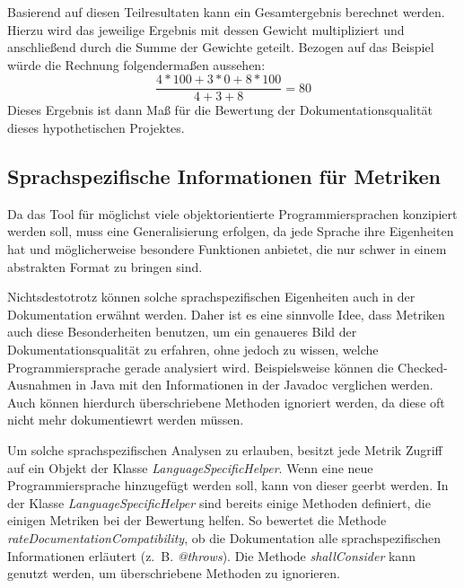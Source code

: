 Basierend auf diesen Teilresultaten kann ein Gesamtergebnis berechnet werden. Hierzu wird das jeweilige Ergebnis mit dessen Gewicht multipliziert und anschließend durch die Summe der Gewichte geteilt. Bezogen auf das Beispiel würde die Rechnung folgendermaßen aussehen:
\begin{equation}
    \frac{4*100 + 3*0 + 8*100}{4+3+8}=80
\end{equation}
Dieses Ergebnis ist dann Maß für die Bewertung der Dokumentationsqualität dieses hypothetischen Projektes. 


\subsection{Sprachspezifische Informationen für Metriken}\label{chapter:langSpec}
Da das Tool für möglichst viele objektorientierte Programmiersprachen konzipiert werden soll, muss eine Generalisierung erfolgen, da jede Sprache ihre Eigenheiten hat und möglicherweise besondere Funktionen anbietet, die nur schwer in einem abstrakten Format zu bringen sind.

Nichtsdestotrotz können solche sprachspezifischen Eigenheiten auch in der Dokumentation erwähnt werden. Daher ist es eine sinnvolle Idee, dass Metriken auch diese Besonderheiten benutzen, um ein genaueres Bild der Dokumentationsqualität zu erfahren, ohne jedoch zu wissen, welche Programmiersprache gerade analysiert wird. Beispielsweise können die Checked-Ausnahmen in Java mit den Informationen in der Javadoc verglichen werden. Auch können hierdurch überschriebene Methoden ignoriert werden, da diese oft nicht mehr dokumentiewrt werden müssen.

\begin{comment}Des Weiteren können. Komponenten einer Schnittstelle oder abstrakten Klasse, die es nicht jeder Programmiersprache gibt, stärker geprüft werden und bei mangelhafter Dokumentation stärker gewichtet werden, da dort die Erfüllung eines Vertrages wichtig ist und daher eine gute Dokumentation wichtiger ist. Auch eine feinere Abstufung je nach Zugriffsmodifizierer einer Komponente wäre so möglich, sodass eine undokumentierte öffentliche Komponente schlechter bewertet wird als eine Komponente mit dem Zugriffsmodifizierer  \textit{protected}.
\end{comment}
Um solche sprachspezifischen Analysen zu erlauben, besitzt jede Metrik Zugriff auf ein Objekt der Klasse \textit{LanguageSpecificHelper}. Wenn eine neue Programmiersprache hinzugefügt werden soll, kann von dieser geerbt werden. In der Klasse \textit{LanguageSpecificHelper} sind bereits einige Methoden definiert, die einigen Metriken bei der Bewertung helfen. So bewertet die Methode \textit{rateDocumentationCompatibility}, ob die Dokumentation alle sprachspezifischen Informationen erläutert (z.~B. \textit{@throws}). Die Methode \textit{shallConsider} kann genutzt werden, um überschriebene Methoden zu ignorieren. 

